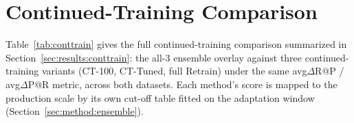 \documentclass[11pt]{article}
\begin{document}
%


%
\appendix

\section{Continued-Training Comparison}
\label{sec:app_conttrain}

Table~\ref{tab:conttrain} gives the full continued-training comparison summarized in
Section~\ref{sec:results:conttrain}: the all-3 ensemble overlay against three continued-training
variants (CT-100, CT-Tuned, full Retrain) under the same avg$\Delta$R@P / avg$\Delta$P@R metric,
across both datasets. Each method's score is mapped to the production scale by its own cut-off table
fitted on the adaptation window (Section~\ref{sec:method:ensemble}).

\begin{table}[t]
  \centering
  \footnotesize
  \setlength{\tabcolsep}{3pt}
  \caption{Comparison with continued training: \textbf{avg$\Delta$R@P} / avg$\Delta$P@R (\%)
    relative to the frozen base at its production cut-offs. BAF figures are ranges over the 7 splits.
    On D-Industrial, CT-100 and Retrain never reach production's precision at any cut-off, so
    their recall at those precision levels is zero. CT-Tuned (1 round, lr$=$0.03) evaluated on
    D-Industrial only. \textbf{Bold column} = our framework (all-3 ensemble).}
  \label{tab:conttrain}
\end{table}
\end{document}
